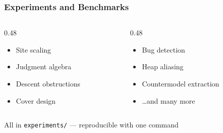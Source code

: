 \begin{frame}
\frametitle{Experiments and Benchmarks}
\begin{center}
\end{center}
\vspace{4pt}
\begin{columns}[T]
\begin{column}{0.48\textwidth}
  \begin{itemize}
    \item Site scaling
    \item Judgment algebra
    \item Descent obstructions
    \item Cover design
  \end{itemize}
\end{column}
\begin{column}{0.48\textwidth}
  \begin{itemize}
    \item Bug detection
    \item Heap aliasing
    \item Countermodel extraction
    \item \ldots and many more
  \end{itemize}
\end{column}
\end{columns}
\vfill
\begin{center}
  {\small\color{gray} All in \texttt{experiments/} --- reproducible with one command}
\end{center}
\end{frame}

